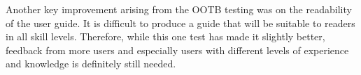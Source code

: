 Another key improvement arising from the OOTB testing was on the readability of the user guide.
It is difficult to produce a guide that will be suitable to readers in all skill levels.
Therefore, while this one test has made it slightly better, feedback from more users and especially users with different levels of experience and knowledge is definitely still needed.



